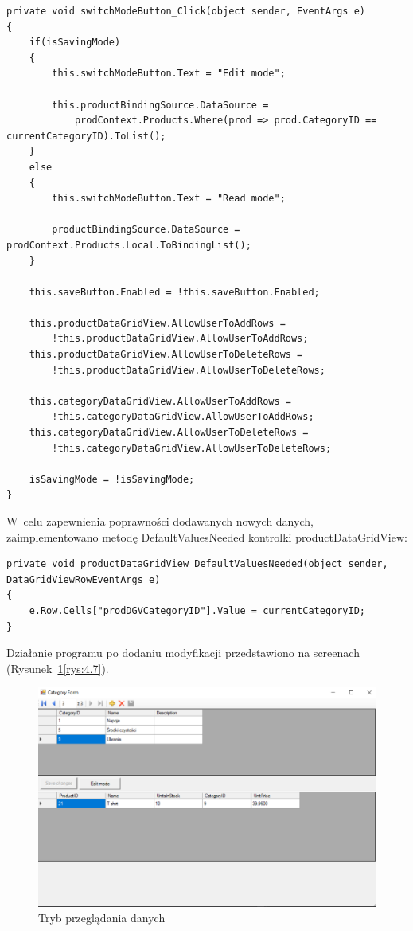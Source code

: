 \documentclass[12pt, a4paper]{mwart}
\begin{document}
\begin{lstlisting}
private void switchModeButton_Click(object sender, EventArgs e)
{
	if(isSavingMode)
	{                
		this.switchModeButton.Text = "Edit mode";

		this.productBindingSource.DataSource = 
			prodContext.Products.Where(prod => prod.CategoryID == currentCategoryID).ToList();
	}
	else
	{
		this.switchModeButton.Text = "Read mode";

		productBindingSource.DataSource = prodContext.Products.Local.ToBindingList();
	}

	this.saveButton.Enabled = !this.saveButton.Enabled;

	this.productDataGridView.AllowUserToAddRows = 
		!this.productDataGridView.AllowUserToAddRows;
	this.productDataGridView.AllowUserToDeleteRows = 
		!this.productDataGridView.AllowUserToDeleteRows;

	this.categoryDataGridView.AllowUserToAddRows = 
		!this.categoryDataGridView.AllowUserToAddRows;
	this.categoryDataGridView.AllowUserToDeleteRows = 
		!this.categoryDataGridView.AllowUserToDeleteRows;

	isSavingMode = !isSavingMode;
}
\end{lstlisting}

W~celu zapewnienia poprawności dodawanych nowych danych, zaimplementowano metodę DefaultValuesNeeded kontrolki productDataGridView:

\begin{lstlisting}
private void productDataGridView_DefaultValuesNeeded(object sender, DataGridViewRowEventArgs e)
{
	e.Row.Cells["prodDGVCategoryID"].Value = currentCategoryID;
}
\end{lstlisting}

Działanie programu po dodaniu modyfikacji przedstawiono na screenach (Rysunek~\ref{rys:4.5}\dywiz{}\ref{rys:4.7}).

\begin{figure}[h]
  \centering
  \includegraphics[scale=0.45]{IV/4-5.png}
  \caption{Tryb przeglądania danych}
  \label{rys:4.5}
\end{figure}
\end{document}
